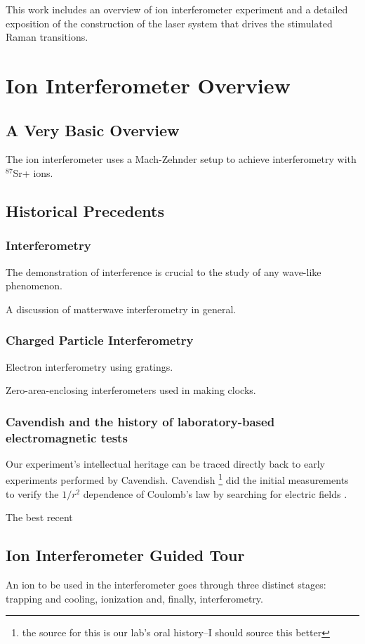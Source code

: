 This work includes an overview of ion interferometer experiment and a detailed exposition of the construction of the laser system that drives the stimulated Raman transitions.


\chapter{Ion Interferometer Overview}

\section{A Very Basic Overview}
The ion interferometer uses a Mach-Zehnder setup to achieve interferometry with $^{87}$Sr+ ions.
\section{Historical Precedents}
 \subsection{Interferometry}
  The demonstration of interference is crucial to the study of any wave-like phenomenon. 

  A discussion of matterwave interferometry in general. 
  \subsection{Charged Particle Interferometry}
  Electron interferometry using gratings. 

Zero-area-enclosing interferometers used in making clocks. 
\subsection{Cavendish and the history of laboratory-based electromagnetic tests}
  Our experiment's intellectual heritage can be traced directly back to early experiments performed by Cavendish. Cavendish \footnote{the source for this is our lab's oral history--I should source this better} did the initial measurements to verify the $1/r^2$ dependence of Coulomb's law by searching for electric fields \cite{jackson}. 

The best recent
\section{Ion Interferometer Guided Tour}
An ion to be used in the interferometer goes through three distinct stages: trapping and cooling, ionization and, finally, interferometry. 


